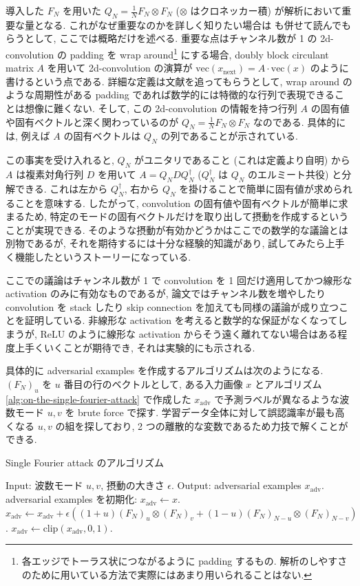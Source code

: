 導入した $F_N$ を用いた $Q_N = \frac{1}{N} F_N \otimes F_N$ ($\otimes$ はクロネッカー積) が解析において重要な量となる.
これがなぜ重要なのかを詳しく知りたい場合は \cite{sedghi2018singular} も併せて読んでもらうとして, ここでは概略だけを述べる.
重要な点はチャンネル数が 1 の 2d-convolution の padding を wrap around\footnote{
各エッジでトーラス状につながるように padding するもの.
解析のしやすさのために用いている方法で実際にはあまり用いられることはない.
}
にする場合, doubly block circulant matrix $A$ を用いて 2d-convolution の演算が $\text{vec} (x_{\text{next}}) = A \cdot \text{vec} (x)$ のように書けるという点である.
詳細な定義は文献を追ってもらうとして, wrap around のような周期性がある padding であれば数学的には特徴的な行列で表現できることは想像に難くない.
そして, この 2d-convolution の情報を持つ行列 $A$ の固有値や固有ベクトルと深く関わっているのが $Q_N = \frac{1}{N} F_N \otimes F_N$ なのである.
具体的には, 例えば $A$ の固有ベクトルは $Q_N$ の列であることが示されている.

この事実を受け入れると, $Q_N$ がユニタリであること (これは定義より自明) から $A$ は複素対角行列 $D$ を用いて $A = Q_N D Q_N^{\dagger}$ ($Q_N^{\dagger}$ は $Q_N$ のエルミート共役) と分解できる.
これは左から $Q_N^{\dagger}$, 右から $Q_N$ を掛けることで簡単に固有値が求められることを意味する.
したがって, convolution の固有値や固有ベクトルが簡単に求まるため, 特定のモードの固有ベクトルだけを取り出して摂動を作成するということが実現できる.
そのような摂動が有効かどうかはここでの数学的な議論とは別物であるが, それを期待するには十分な経験的知識があり, 試してみたら上手く機能したというストーリーになっている.

ここでの議論はチャンネル数が 1 で convolution を 1 回だけ適用してかつ線形な activation のみに有効なものであるが, 論文ではチャンネル数を増やしたり convolution を stack したり skip connection を加えても同様の議論が成り立つことを証明している.
非線形な activation を考えると数学的な保証がなくなってしまうが, ReLU のように線形な activation からそう遠く離れてない場合はある程度上手くいくことが期待でき, それは実験的にも示される.

具体的に adversarial examples を作成するアルゴリズムは次のようになる.
$(F_N)_u$ を $u$ 番目の行のベクトルとして, ある入力画像 $x$ とアルゴリズム \ref{alg:on-the-single-fourier-attack} で作成した $x_{\text{adv}}$ で予測ラベルが異なるような波数モード $u, v$ を brute force で探す.
学習データ全体に対して誤認識率が最も高くなる $u, v$ の組を探しており, 2 つの離散的な変数であるため力技で解くことができる.
%
\begin{algorithm}
\caption{Single Fourier attack のアルゴリズム}
\label{alg:on-the-single-fourier-attack}
\begin{algorithmic}[1]
    \State Input: 波数モード $u, v$, 摂動の大きさ $\epsilon$.
    \State Output: adversarial examples $x_{\text{adv}}$.
	\State adversarial examples を初期化: $x_{\text{adv}} \leftarrow x$.
	\State $x_{\text{adv}} \leftarrow x_{\text{adv}} + \epsilon ( (1 + u) (F_N)_u \otimes (F_N)_v + (1 - u) (F_N)_{N - u} \otimes (F_N)_{N - v} )$.
	\State $x_{\text{adv}} \leftarrow \text{clip} (x_{\text{adv}},0,1)$.
	\EndFor
\end{algorithmic} 
\end{algorithm}
%

